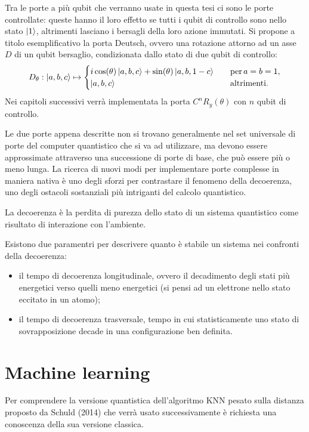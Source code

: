Tra le porte a più qubit che verranno usate in questa tesi ci sono le porte controllate: 
queste hanno il loro effetto se tutti i qubit di controllo sono nello stato $\ket{1}$, 
altrimenti lasciano i bersagli della loro azione immutati. 
Si propone a titolo esemplificativo la porta Deutsch, ovvero una rotazione attorno ad un 
asse $D$ di un qubit bersaglio, condizionata dallo stato di due qubit di controllo: 
\begin{equation}
    D_{\theta} : \ket{a,b,c} \mapsto \begin{cases}
        i \cos(\theta)\ket{a,b,c} + \sin(\theta)\ket{a,b,1-c} \quad &\text{per}\, a=b=1, \\ 
        \ket{a,b,c} \quad &\text{altrimenti}.
    \end{cases}
\end{equation}
Nei capitoli successivi verrà implementata la porta $C^n R_y (\theta)$ con $n$ qubit 
di controllo. 

Le due porte appena descritte non si trovano generalmente nel set universale di porte 
del computer quantistico che si va ad utilizzare, ma devono 
essere approssimate attraverso una successione di porte di base, che può essere più o 
meno lunga. La ricerca di nuovi modi per implementare porte complesse in maniera 
nativa \cite{PhysRevApplied.9.051001} è uno degli sforzi per contrastare il fenomeno della 
decoerenza, uno degli ostacoli sostanziali più intriganti del calcolo quantistico. 

La decoerenza è la perdita di purezza dello stato di un sistema quantistico come risultato 
di interazione con l'ambiente. 

Esistono due paramentri per descrivere quanto è stabile un sistema nei confronti della decoerenza: 
\begin{itemize}
    \item il tempo di decoerenza longitudinale, ovvero il decadimento degli stati più energetici verso quelli meno energetici
    (si pensi ad un elettrone nello stato eccitato in un atomo);
    \item il tempo di decoerenza trasversale, tempo in cui statisticamente uno stato di sovrapposizione decade in una configurazione 
    ben definita. 
\end{itemize}


\section{Machine learning}

Per comprendere la versione quantistica dell'algoritmo \ac{KNN}
pesato sulla distanza proposto da Schuld (2014) che verrà usato 
successivamente è richiesta una conoscenza della sua versione classica. 

